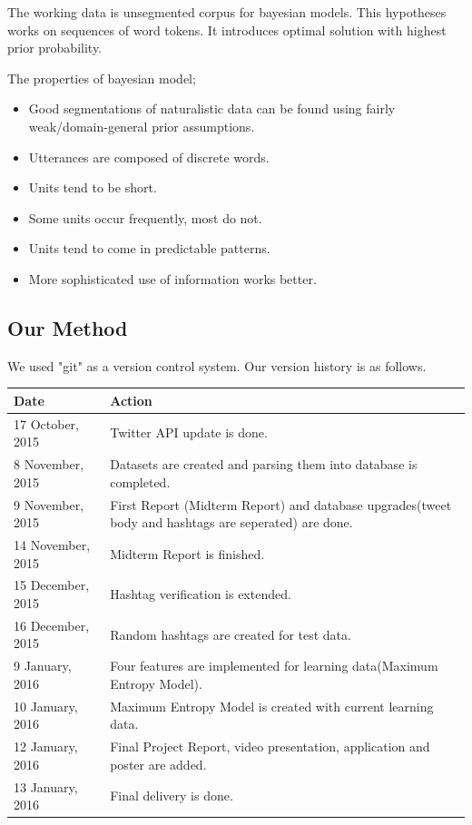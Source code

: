 \documentclass[12pt]{comjnl}
\begin{document}
The working data is unsegmented corpus for bayesian models. This hypotheses works on sequences of word tokens.
It introduces optimal solution with highest prior probability.

The properties of bayesian model;
\begin{itemize}
\item Good segmentations of naturalistic data can be found using fairly weak/domain-general prior assumptions.
\item Utterances are composed of discrete words.
\item Units tend to be short.
\item Some units occur frequently, most do not.
\item Units tend to come in predictable patterns.
\item More sophisticated use of information works better.
\end{itemize}

\subsection{Our Method}
We used "git" as a version control system. Our version history is as follows.

\begin{center}
\begin{tabular}{ | l | p{10cm} |}
\hline
Date & Action\\ \hline
17 October, 2015 & Twitter API update is done.\\ \hline
8 November, 2015 & Datasets are created and parsing them into database is completed.\\ \hline
9 November, 2015 & First Report (Midterm Report) and database upgrades(tweet body and hashtags are seperated) are done.\\ \hline
14 November, 2015 & Midterm Report is finished.\\ \hline
15 December, 2015 & Hashtag verification is extended.\\ \hline
16 December, 2015 & Random hashtags are created for test data.\\ \hline
9 January, 2016 & Four features are implemented for learning data(Maximum Entropy Model).\\ \hline
10 January, 2016 & Maximum Entropy Model is created with current learning data.\\ \hline
12 January, 2016 & Final Project Report, video presentation, application and poster are added.\\ \hline
13 January, 2016 & Final delivery is done.\\
\hline
\end{tabular}
\end{center}
\end{document}
